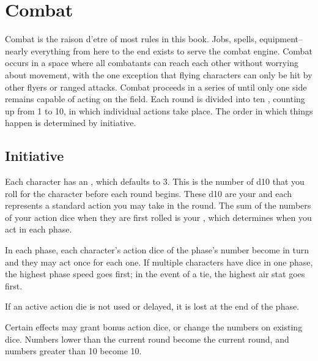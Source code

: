 
\section{Combat}\label{sec:combat}
\begin{multicols}{2}
    Combat is the raison d’etre of most rules in this book. Jobs, spells, equipment-- nearly everything from here to the end exists to serve the combat engine. Combat occurs in a space where all combatants can reach each other without worrying about movement, with the one exception that flying characters can only be hit by other flyers or ranged attacks. Combat proceeds in a series of  until only one side remains capable of acting on the field. Each round is divided into ten , counting up from 1 to 10, in which individual actions take place. The order in which things happen is determined by initiative.


    \subsection{Initiative}\label{subsec:init}

        Each character has an , which defaults to 3. This is the number of d10 that you roll for the character before each round begins. These d10 are your  and each represents a standard action you may take in the round. The sum of the numbers of your action dice when they are first rolled is your , which determines when you act in each phase.

        In each phase, each character's action dice of the phase's number become  in turn and they may act once for each one. If multiple characters have dice in one phase, the highest phase speed goes first; in the event of a tie, the highest air stat goes first.

        If an active action die is not used or delayed, it is lost at the end of the phase.

        Certain effects may grant bonus action dice, or change the numbers on existing dice. Numbers lower than the current round become the current round, and numbers greater than 10 become 10.


\end{multicols}

